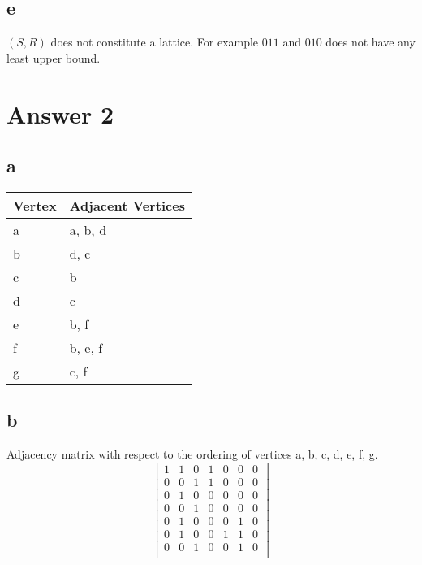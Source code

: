 \documentclass[11pt]{article}
\begin{document}
\subsection*{e}
$(S, R)$ does not constitute a lattice. For example $011$ and $010$ does not have any least upper bound.

\section*{Answer 2}
\subsection*{a}
    \begin{table}[H]
    \centering
    \begin{tabular}{|l|l|}
    \hline
    \textbf{Vertex} & \textbf{Adjacent Vertices} \\ \hline
    a                                & a, b, d                                     \\
    b                                & d, c                                        \\
    c                                & b                                           \\
    d                                & c                                           \\
    e                                & b, f                                        \\
    f                                & b, e, f                                     \\
    g                                & c, f                                        \\ \hline
    \end{tabular}
    \end{table}
\subsection*{b}
Adjacency matrix with respect to the ordering of vertices a, b, c, d, e, f, g.
\[
  \begin{bmatrix}
    1 & 1 & 0 & 1 & 0 & 0 & 0 \\
    0 & 0 & 1 & 1 & 0 & 0 & 0 \\
    0 & 1 & 0 & 0 & 0 & 0 & 0 \\
    0 & 0 & 1 & 0 & 0 & 0 & 0 \\
    0 & 1 & 0 & 0 & 0 & 1 & 0 \\
    0 & 1 & 0 & 0 & 1 & 1 & 0 \\
    0 & 0 & 1 & 0 & 0 & 1 & 0 \\
  \end{bmatrix}
\]
\end{document}
